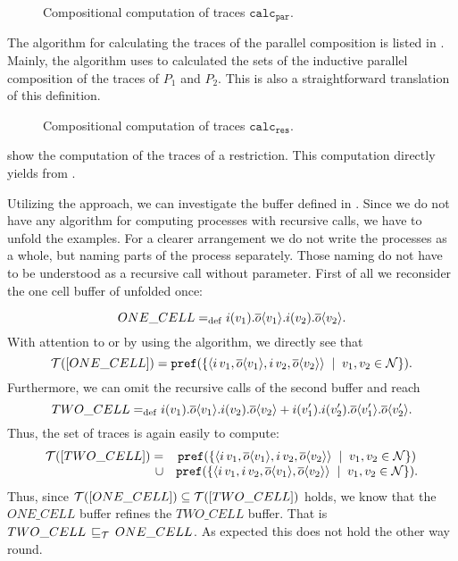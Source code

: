 \begin{figure}[h!]

\caption{Compositional computation of traces $\mathtt{calc}_{\mathtt{par}}$.}
\label{fig_comp_comput_par}
\end{figure} %

The algorithm for calculating the traces of the parallel composition is listed in . Mainly, the algorithm uses  to calculated the sets of the inductive parallel composition of the traces of $P_1$ and $P_2$. This is also a straightforward translation of this definition.

\begin{figure}[h]

\caption{Compositional computation of traces $\mathtt{calc}_{\mathtt{res}}$.}
\label{fig_comp_comput_res}
\end{figure}

 show the computation of the traces of a restriction. This computation directly yields from .

Utilizing the approach, we can investigate the buffer defined in . Since we do not have any algorithm for computing processes with recursive calls, we have to unfold the examples. For a clearer arrangement we do not write the processes as a whole, but naming parts of the process separately. Those naming do not have to be understood as a recursive call without parameter. First of all we reconsider the one cell buffer of \cite{milner} unfolded once:

\[ONE\_CELL=_{\mathrm{def}}i(v_1).\overline{o}\langle v_1\rangle.i(v_2).\overline{o}\langle v_2\rangle.\]
With attention to  or by using the algorithm, we directly see that 
\[\traces[ONE\_CELL]=\pref{\set[v_1,v_2\in\names]{\seq{\inpa{i}{v_1},\outa{o}{v_1},\inpa{i}{v_2},\outa{o}{v_2}}}}.\]
Furthermore, we can omit the recursive calls of the second buffer and reach
\[TWO\_CELL=_{\mathrm{def}}i(v_1).\overline{o}\langle v_1\rangle.i(v_2).\overline{o}\langle v_2\rangle + i(v_1').i(v_2').\overline{o}\langle v_1'\rangle.\overline{o}\langle v_2'\rangle.\]
Thus, the set of traces is again easily to compute:
\begin{align*}
\begin{array}{rcl}
 \traces[TWO\_CELL]=&\pref{\set[v_1,v_2\in\names]{\seq{\inpa{i}{v_1},\outa{o}{v_1},\inpa{i}{v_2},\out{o}{v_2}}}} \\
\cup&\pref{\set[v_1,v_2\in\names]{\seq{\inpa{i}{v_1},\inpa{i}{v_2},\outa{o}{v_1},\outa{o}{v_2}}}}.
\end{array}
\end{align*}
Thus, since $\traces[ONE\_CELL]\subseteq{}\traces[TWO\_CELL]$ holds, we know that the $ONE\_CELL$ buffer refines the $TWO\_CELL$ buffer. That is $TWO\_CELL \refi ONE\_CELL$. As expected this does not hold the other way round.

